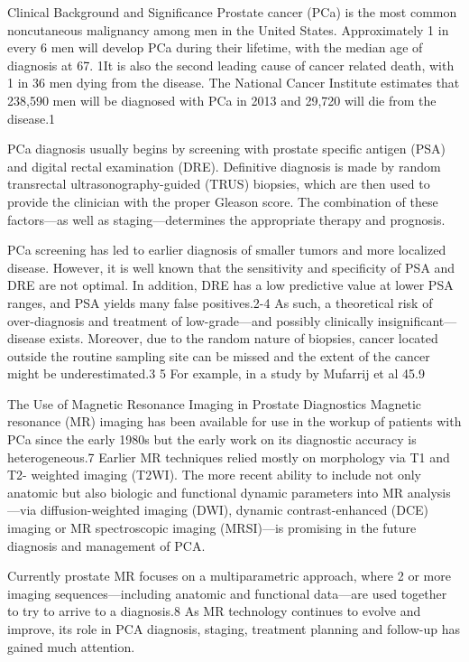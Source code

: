 ﻿Clinical Background and Significance 
Prostate cancer (PCa) is the most common noncutaneous malignancy among men in the United States. Approximately 1 in every 6 men will develop PCa during their lifetime, with the median age of diagnosis at 67. 1It is also the second leading cause of cancer related death, with 1 in 36 men dying from the disease. The National Cancer Institute estimates that 238,590 men will be diagnosed with PCa in 2013 and 29,720 will die from the disease.1

PCa diagnosis usually begins by screening with prostate specific antigen (PSA) and digital rectal examination (DRE).  Definitive diagnosis is made by random transrectal ultrasonography-guided (TRUS) biopsies, which are then used to provide the clinician with the proper Gleason score. The combination of these factors—as well as staging—determines the appropriate therapy and prognosis. 

PCa screening has led to earlier diagnosis of smaller tumors and more localized disease.  However, it is well known that the sensitivity and specificity of PSA and DRE are not optimal. In addition, DRE has a low predictive value at lower PSA ranges, and PSA yields many false positives.2-4 As such, a theoretical risk of over-diagnosis and treatment of low-grade—and possibly clinically insignificant—disease exists. Moreover, due to the random nature of biopsies, cancer located outside the routine sampling site can be missed and the extent of the cancer might be underestimated.3 5 For example, in a study by Mufarrij et al 45.9%

The Use of Magnetic Resonance Imaging in Prostate Diagnostics
Magnetic resonance (MR) imaging has been available for use in the workup of patients with PCa since the early 1980s but the early work on its diagnostic accuracy is heterogeneous.7 Earlier MR techniques relied mostly on morphology via T1 and T2- weighted imaging (T2WI). The more recent ability to include not only anatomic but also biologic and functional dynamic parameters into MR analysis—via diffusion-weighted imaging (DWI), dynamic contrast-enhanced (DCE) imaging or MR spectroscopic imaging (MRSI)—is promising in the future diagnosis and management of PCA.

 Currently prostate MR focuses on a multiparametric approach, where 2 or more imaging sequences—including anatomic and functional data—are used together to try to arrive to a diagnosis.8 As MR technology continues to evolve and improve, its role in PCA diagnosis, staging, treatment planning and follow-up has gained much attention.

